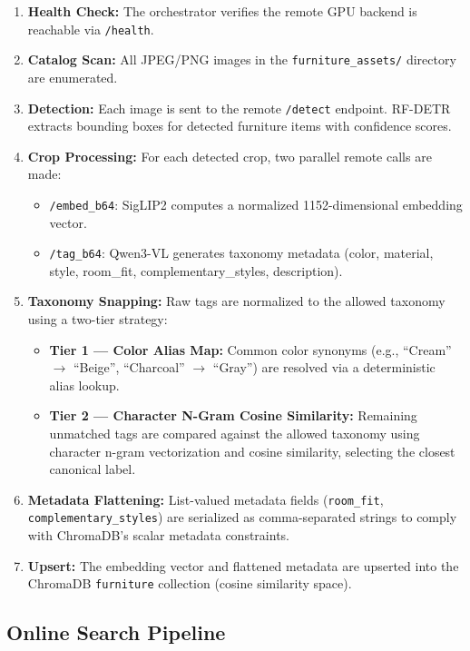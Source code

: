\begin{enumerate}
    \item \textbf{Health Check:} The orchestrator verifies the remote GPU backend is reachable via \texttt{/health}.
    \item \textbf{Catalog Scan:} All JPEG/PNG images in the \texttt{furniture\_assets/} directory are enumerated.
    \item \textbf{Detection:} Each image is sent to the remote \texttt{/detect} endpoint. RF-DETR extracts bounding boxes for detected furniture items with confidence scores.
    \item \textbf{Crop Processing:} For each detected crop, two parallel remote calls are made:
    \begin{itemize}
        \item \texttt{/embed\_b64}: SigLIP2 computes a normalized 1152-dimensional embedding vector.
        \item \texttt{/tag\_b64}: Qwen3-VL generates taxonomy metadata (color, material, style, room\_fit, complementary\_styles, description).
    \end{itemize}
    \item \textbf{Taxonomy Snapping:} Raw tags are normalized to the allowed taxonomy using a two-tier strategy:
    \begin{itemize}
        \item \textbf{Tier 1 --- Color Alias Map:} Common color synonyms (e.g., ``Cream'' $\rightarrow$ ``Beige'', ``Charcoal'' $\rightarrow$ ``Gray'') are resolved via a deterministic alias lookup.
        \item \textbf{Tier 2 --- Character N-Gram Cosine Similarity:} Remaining unmatched tags are compared against the allowed taxonomy using character n-gram vectorization and cosine similarity, selecting the closest canonical label.
    \end{itemize}
    \item \textbf{Metadata Flattening:} List-valued metadata fields (\texttt{room\_fit}, \texttt{complementary\_styles}) are serialized as comma-separated strings to comply with ChromaDB's scalar metadata constraints.
    \item \textbf{Upsert:} The embedding vector and flattened metadata are upserted into the ChromaDB \texttt{furniture} collection (cosine similarity space).
\end{enumerate}

\subsection{Online Search Pipeline}
\label{subsec:search}

